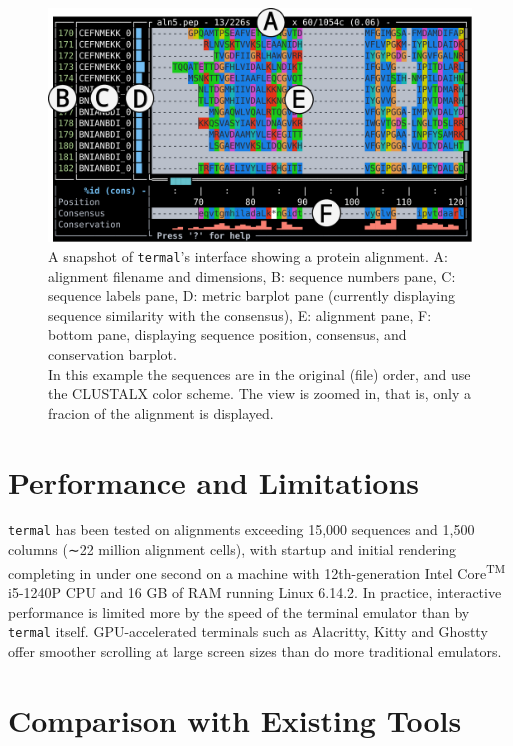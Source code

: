\documentclass[11pt]{article}
\begin{document}
\begin{figure}[htbp]
\centering
	\includegraphics[width=\textwidth]{figure-1.pdf}
\caption{%
	A snapshot of \texttt{termal}'s interface showing a protein alignment. A:
	alignment filename and dimensions, B: sequence numbers pane, C: sequence
	labels pane, D: metric barplot pane (currently displaying sequence similarity
	with the consensus), E: alignment pane, F: bottom pane, displaying sequence
	position, consensus, and conservation barplot. \\
	In this example the sequences are in the original (file) order, and use the
	CLUSTALX color scheme. The view is zoomed in, that is, only a fracion of the
	alignment is displayed. }
	\label{fig:screen}
\end{figure}


\section*{Performance and Limitations}

\texttt{termal} has been tested on alignments exceeding 15,000 sequences and
1,500 columns (∼22 million alignment cells), with startup and initial rendering
completing in under one second on a machine with 12th-generation
Intel\textregistered{} Core\textsuperscript{TM} i5-1240P CPU and 16 GB of RAM
running Linux 6.14.2. In practice, interactive performance is limited more by
the speed of the terminal emulator than by \texttt{termal} itself.
GPU-accelerated terminals such as Alacritty\cite{alacritty}, Kitty\cite{kitty}
and Ghostty\cite{ghostty} offer smoother scrolling at large screen sizes than do
more traditional emulators.


\section*{Comparison with Existing Tools}
\end{document}
